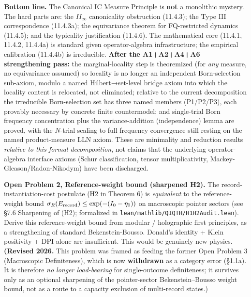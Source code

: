 \documentclass[11pt,a4paper]{article}
\begin{document}
\textbf{Bottom line.} The Canonical IC Measure Principle is \textbf{not} a monolithic mystery. The hard parts are: the $II_\infty$ canonicality obstruction (11.4.3); the Type III correspondence (11.4.3a); the equivariance theorem for FQ-restricted dynamics (11.4.5); and the typicality justification (11.4.6). The mathematical core (11.4.1, 11.4.2, 11.4.4a) is standard given operator-algebra infrastructure; the empirical calibration (11.4.4b) is irreducible. \textbf{After the A1+A2+A4+A6 strengthening pass:} the marginal-locality step is theoremized (for \emph{any} measure, no equivariance assumed) so locality is no longer an independent Born-selection sub-axiom, modulo a named Hilbert→set-level bridge axiom into which the locality content is relocated, not eliminated; relative to the current decomposition the irreducible Born-selection set has three named members (P1/P2/P3), each provably necessary by concrete finite countermodel; and single-trial Born frequency concentration plus the variance-addition (independence) lemma are proved, with the $N$-trial scaling to full frequency convergence still resting on the named product-measure LLN axiom. These are minimality and reduction results \emph{relative to this formal decomposition}, not claims that the underlying operator-algebra interface axioms (Schur classification, tensor multiplicativity, Mackey-Gleason/Radon-Nikodym) have been discharged.

\textbf{Open Problem 2, Reference-weight bound (sharpened H2).}
The record-instantiation-cost postulate (H2 in Theorem 6) is \emph{equivalent} to the reference-weight bound $\sigma_R(E_{\rm record}) \le \exp(-(I_0 - \eta_0))$ on macroscopic pointer sectors (see §7.6 Sharpening of (H2); formalized in \texttt{lean/mathlib/QIQTH/H1H2Audit.lean}). Derive this reference-weight bound from modular / holographic first principles, as a strengthening of standard Bekenstein-Bousso. Donald's identity + Klein positivity + DPI alone are insufficient. This would be genuinely new physics. \textbf{(Revised 2026.} This problem was framed as feeding the former Open Problem 3 (Macroscopic Definiteness), which is now \textbf{withdrawn} as a category error (§1.1a). It is therefore \emph{no longer load-bearing} for single-outcome definiteness; it survives only as an optional sharpening of the pointer-sector Bekenstein–Bousso weight bound, not as a route to a capacity exclusion of multi-record states.)
\end{document}
